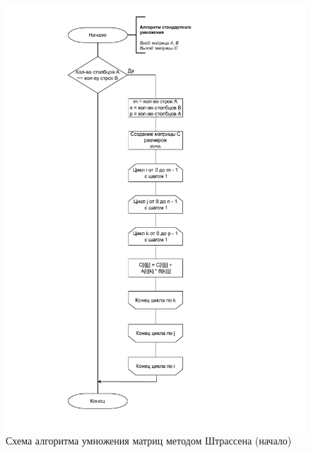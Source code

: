 \begin{figure}[h]
	\centering
	\includegraphics[height=0.9\textheight, page=6]{img/algorithms.pdf}
	\caption{Схема алгоритма умножения матриц методом Штрассена (начало)}
	\label{fig:Str1}
\end{figure}

\clearpage

